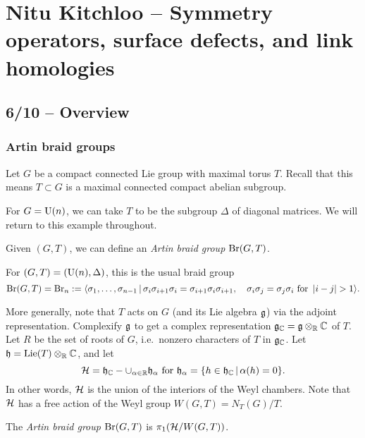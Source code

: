 \chapter{Nitu Kitchloo -- Symmetry operators, surface defects, and link homologies}

\section{6/10 -- Overview}

\subsection{Artin braid groups}

Let $G$ be a compact connected Lie group with maximal torus $T$.
Recall that this means $T \subset G$ is a maximal connected compact abelian subgroup.

\begin{ex}
	For $G = \mathrm{U}(n)$, we can take $T$ to be the subgroup $\Delta$ of diagonal matrices.
	We will return to this example throughout.
\end{ex}

Given $(G,T)$, we can define an \emph{Artin braid group} $\mathrm{Br}(G, T)$.

\begin{ex}
	For $(G, T) = (\mathrm{U}(n), \Delta)$, this is the usual braid group
	\[
		\mathrm{Br}(G, T) = \mathrm{Br}_n := \langle \sigma_1, \dots, \sigma_{n-1} \, | \, \sigma_i \sigma_{i+1} \sigma_i = \sigma_{i+1} \sigma_i \sigma_{i+1}, \hspace{1em} \sigma_i \sigma_j = \sigma_j \sigma_i \textrm{ for } \left|i - j\right| > 1 \rangle.
	\]
\end{ex}

More generally, note that $T$ acts on $G$ (and its Lie algebra $\mathfrak{g}$) via the adjoint representation.
Complexify $\mathfrak{g}$ to get a complex representation $\mathfrak{g}_{\mathbb{C}} = \mathfrak{g} \otimes_{\mathbb{R}} \mathbb{C}$ of $T$.
Let $R$ be the set of roots of $G$, i.e.\ nonzero characters of $T$ in $\mathfrak{g}_{\mathbb{C}}$.
Let $\mathfrak{h} = \operatorname{Lie}(T) \otimes_{\mathbb{R}} \mathbb{C}$, and let
\[
	\mathcal{H} = \mathfrak{h}_{\mathbb{C}} - \cup_{\alpha \in \mathbb{R}} \mathfrak{h}_\alpha \textrm{ for } \mathfrak{h}_\alpha = \{ h \in \mathfrak{h}_{\mathbb{C}} \, | \, \alpha(h) = 0 \}.
\]
In other words, $\mathcal{H}$ is the union of the interiors of the Weyl chambers.
Note that $\mathcal{H}$ has a free action of the Weyl group $W(G, T) = N_T(G) / T$.

\begin{dfn}
	The \emph{Artin braid group} $\mathrm{Br}(G, T)$ is $\pi_1(\mathcal{H} / W(G, T))$.
\end{dfn}

